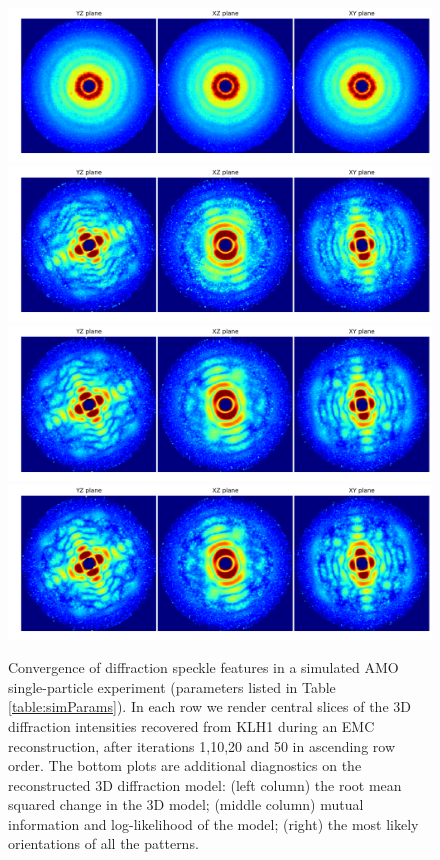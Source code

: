 \documentclass[]{iucr}              %
\begin{document}
\begin{figure}
\caption{Convergence of diffraction speckle features in a simulated AMO single-particle experiment (parameters listed in Table \ref{table:simParams}). In each row we render central slices of the 3D diffraction intensities recovered from KLH1 during an EMC reconstruction, after iterations 1,10,20 and 50 in ascending row order. The bottom plots are additional diagnostics on the reconstructed 3D diffraction model: (left column) the root mean squared change in the 3D model; (middle column) mutual information and log-likelihood of the model; (right) the most likely orientations of all the patterns.}
\includegraphics[height=0.13\textheight]{figures/amo_low_intens_001.png} 
\includegraphics[height=0.13\textheight]{figures/amo_low_intens_010.png}
\includegraphics[height=0.13\textheight]{figures/amo_low_intens_020.png} 
\includegraphics[height=0.13\textheight]{figures/amo_low_intens_050.png} \label{fig:amo_low_intens}

\end{figure}
\end{document}

